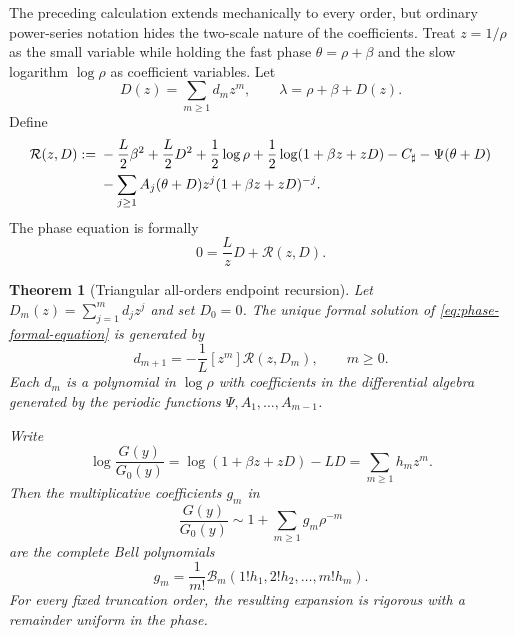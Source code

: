 \documentclass[11pt,oneside]{article}
\numberwithin{equation}{section}
\newtheorem{theorem}{Theorem}[section]
\theoremstyle{definition}
\theoremstyle{remark}
\begin{document}
The preceding calculation extends mechanically to every order, but ordinary power-series
notation hides the two-scale nature of the coefficients.  Treat $z=1/\rho$ as the small
variable while holding the fast phase $\theta=\rho+\beta$ and the slow logarithm
$\log\rho$ as coefficient variables.  Let
\begin{equation}
 D(z)=\sum_{m\ge1}d_mz^m,
 \qquad
 \lambda=\rho+\beta+D(z).
 \label{eq:D-formal}
\end{equation}
Define
\begin{align}
 \mathcal R(z,D):={}&-\frac L2\beta^2+\frac L2D^2+\frac12\log\rho
 +\frac12\log(1+\beta z+zD)-C_{\sharp}-\Psi(\theta+D)
 \notag\\
 &-\sum_{j\ge1}A_j(\theta+D)z^j(1+\beta z+zD)^{-j}.
 \label{eq:R-formal-endpoint}
\end{align}
The phase equation is formally
\begin{equation}
 0=\frac LzD+\mathcal R(z,D).
 \label{eq:phase-formal-equation}
\end{equation}

\begin{theorem}[Triangular all-orders endpoint recursion]
\label{thm:all-orders-endpoint-recursion}
Let $D_m(z)=\sum_{j=1}^{m}d_jz^j$ and set $D_0=0$.  The unique formal
solution of \eqref{eq:phase-formal-equation} is generated by
\begin{equation}
 \boxed{
 d_{m+1}=-\frac1L[z^m]\mathcal R(z,D_m),
 \qquad m\ge0.}
 \label{eq:d-all-orders-recursion}
\end{equation}
Each $d_m$ is a polynomial in $\log\rho$ with coefficients in the differential algebra
generated by the periodic functions $\Psi,A_1,\ldots,A_{m-1}$.

Write
\begin{equation}
 \log\frac{G(y)}{G_0(y)}
 =\log(1+\beta z+zD)-LD
 =\sum_{m\ge1}h_mz^m.
 \label{eq:h-all-orders}
\end{equation}
Then the multiplicative coefficients $g_m$ in
\begin{equation}
 \frac{G(y)}{G_0(y)}\sim1+\sum_{m\ge1}g_m\rho^{-m}
 \label{eq:g-all-orders}
\end{equation}
are the complete Bell polynomials
\begin{equation}
 \boxed{
 g_m=\frac1{m!}\mathcal B_m(1!h_1,2!h_2,\ldots,m!h_m).}
 \label{eq:g-Bell}
\end{equation}
For every fixed truncation order, the resulting expansion is rigorous with a remainder
uniform in the phase.
\end{theorem}
\end{document}
